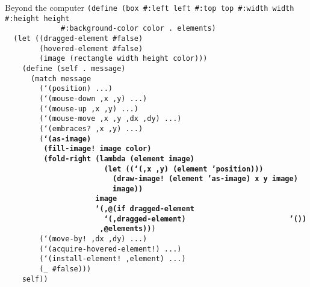 \begin{frame}{Beyond the computer}
  \tiny
  \texttt{(define (box \#:left left \#:top top \#:width width \#:height height\\
    \ \ \ \ \ \ \ \ \ \ \ \ \ \#:background-color color .\ elements)\\
    \ \ (let ((dragged-element \#false)\\
    \ \ \ \ \ \ \ \ (hovered-element \#false)\\
    \ \ \ \ \ \ \ \ (image (rectangle width height color)))\\
    \ \ \ \ (define (self .\ message)\\
    \ \ \ \ \ \ (match message\\
    \ \ \ \ \ \ \ \ (`(position) ...)\\
    \ \ \ \ \ \ \ \ (`(mouse-down ,x ,y) ...)\\
    \ \ \ \ \ \ \ \ (`(mouse-up ,x ,y) ...)\\
    \ \ \ \ \ \ \ \ (`(mouse-move ,x ,y ,dx ,dy) ...)\\
    \ \ \ \ \ \ \ \ (`(embraces?\ ,x ,y) ...)\\
    \ \ \ \ \ \ \ \ (\textbf{`(as-image)\\
    \ \ \ \ \ \ \ \ \ (fill-image!\ image color)\\
    \ \ \ \ \ \ \ \ \ (fold-right (lambda (element image)\\
    \ \ \ \ \ \ \ \ \ \ \ \ \ \ \ \ \ \ \ \ \ \ \ (let ((`(,x ,y) (element 'position)))\\
    \ \ \ \ \ \ \ \ \ \ \ \ \ \ \ \ \ \ \ \ \ \ \ \ \ (draw-image!\ (element 'as-image) x y image)\\
    \ \ \ \ \ \ \ \ \ \ \ \ \ \ \ \ \ \ \ \ \ \ \ \ \ image))\\
    \ \ \ \ \ \ \ \ \ \ \ \ \ \ \ \ \ \ \ \ \ image\\
    \ \ \ \ \ \ \ \ \ \ \ \ \ \ \ \ \ \ \ \ \ `(,@(if dragged-element\\
    \ \ \ \ \ \ \ \ \ \ \ \ \ \ \ \ \ \ \ \ \ \ \ `(,dragged-element)\\
    \ \ \ \ \ \ \ \ \ \ \ \ \ \ \ \ \ \ \ \ \ \ \ '())\\
    \ \ \ \ \ \ \ \ \ \ \ \ \ \ \ \ \ \ \ \ \ \ ,@elements))})\\
    \ \ \ \ \ \ \ \ (`(move-by!\ ,dx ,dy) ...)\\
    \ \ \ \ \ \ \ \ (`(acquire-hovered-element!) ...)\\
    \ \ \ \ \ \ \ \ (`(install-element!\ ,element) ...)\\
    \ \ \ \ \ \ \ \ (\_ \#false)))\\
    \ \ \ \ self))} \\
  \ \\ \ \\ \ 
\end{frame}

